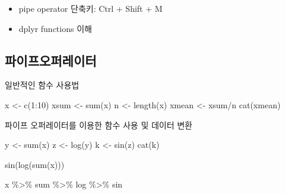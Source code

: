 \documentclass[
]{book}
\newenvironment{Shaded}{\begin{snugshade}}{\end{snugshade}}
\newcommand{\DecValTok}[1]{\textcolor[rgb]{0.00,0.00,0.81}{#1}}
\newcommand{\FunctionTok}[1]{\textcolor[rgb]{0.00,0.00,0.00}{#1}}
\newcommand{\NormalTok}[1]{#1}
\newcommand{\OtherTok}[1]{\textcolor[rgb]{0.56,0.35,0.01}{#1}}
\newcommand{\SpecialCharTok}[1]{\textcolor[rgb]{0.00,0.00,0.00}{#1}}
\providecommand{\tightlist}{%
  \setlength{\itemsep}{0pt}\setlength{\parskip}{0pt}}
\begin{document}
\begin{itemize}
\tightlist
\item
  pipe operator 단축키: Ctrl + Shift + M
\item
  dplyr functions 이해
\end{itemize}

\hypertarget{uxd30cuxc774uxd504uxc624uxd37cuxb808uxc774uxd130}{%
\subsection{파이프오퍼레이터}\label{uxd30cuxc774uxd504uxc624uxd37cuxb808uxc774uxd130}}

일반적인 함수 사용법

\begin{Shaded}
\begin{Highlighting}[]
\NormalTok{x }\OtherTok{\textless{}{-}} \FunctionTok{c}\NormalTok{(}\DecValTok{1}\SpecialCharTok{:}\DecValTok{10}\NormalTok{)}
\NormalTok{xsum }\OtherTok{\textless{}{-}} \FunctionTok{sum}\NormalTok{(x)}
\NormalTok{n }\OtherTok{\textless{}{-}} \FunctionTok{length}\NormalTok{(x)}
\NormalTok{xmean }\OtherTok{\textless{}{-}}\NormalTok{ xsum}\SpecialCharTok{/}\NormalTok{n}
\FunctionTok{cat}\NormalTok{(xmean)}
\end{Highlighting}
\end{Shaded}

파이프 오퍼레이터를 이용한 함수 사용 및 데이터 변환

\begin{Shaded}
\begin{Highlighting}[]
\NormalTok{y }\OtherTok{\textless{}{-}} \FunctionTok{sum}\NormalTok{(x)}
\NormalTok{z }\OtherTok{\textless{}{-}} \FunctionTok{log}\NormalTok{(y)}
\NormalTok{k }\OtherTok{\textless{}{-}} \FunctionTok{sin}\NormalTok{(z)}
\FunctionTok{cat}\NormalTok{(k)}

\FunctionTok{sin}\NormalTok{(}\FunctionTok{log}\NormalTok{(}\FunctionTok{sum}\NormalTok{(x)))}

\NormalTok{x }\SpecialCharTok{\%\textgreater{}\%} 
\NormalTok{  sum }\SpecialCharTok{\%\textgreater{}\%} 
\NormalTok{  log }\SpecialCharTok{\%\textgreater{}\%} 
\NormalTok{  sin}
\end{Highlighting}
\end{Shaded}
\end{document}
